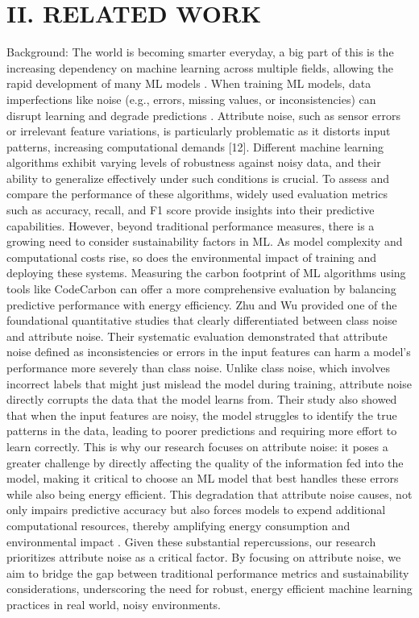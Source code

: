 \documentclass[conference]{IEEEtran}
\begin{document}
\section*{II. RELATED WORK}
Background: The world is becoming smarter everyday, a big part of this is the increasing dependency on machine learning across multiple fields, allowing the rapid development of many ML models \cite{bain_ai_sustainability}. When training ML models, data imperfections like noise (e.g., errors, missing values, or inconsistencies) can disrupt learning and degrade predictions \cite{sciencedirect_noise}. Attribute noise, such as sensor errors or irrelevant feature variations, is particularly problematic as it distorts input patterns, increasing computational demands [12]. Different machine learning algorithms exhibit varying levels of robustness against noisy data, and their ability to generalize effectively under such conditions is crucial. To assess and compare the performance of these algorithms, widely used evaluation metrics such as accuracy, recall, and F1 score provide insights into their predictive capabilities. However, beyond traditional performance measures, there is a growing need to consider sustainability factors in ML. As model complexity and computational costs rise, so does the environmental impact of training and deploying these systems. Measuring the carbon footprint of ML algorithms using tools like CodeCarbon can offer a more comprehensive evaluation by balancing predictive performance with energy efficiency.
\newline
\newline
Zhu and Wu \cite{wuzu} provided one of the foundational quantitative studies that clearly differentiated between class noise and attribute noise. Their systematic evaluation demonstrated that attribute noise defined as inconsistencies or errors in the input features can harm a model's performance more severely than class noise. Unlike class noise, which involves incorrect labels that might just mislead the model during training, attribute noise directly corrupts the data that the model learns from. Their study also showed that when the input features are noisy, the model struggles to identify the true patterns in the data, leading to poorer predictions and requiring more effort to learn correctly. This is why our research focuses on attribute noise: it poses a greater challenge by directly affecting the quality of the information fed into the model, making it critical to choose an ML model that best handles these errors while also being energy efficient.
\newline
\newline
This degradation that attribute noise causes, not only impairs predictive accuracy but also forces models to expend additional computational resources, thereby amplifying energy consumption and environmental impact \cite{wuzu}. Given these substantial repercussions, our research prioritizes attribute noise as a critical factor. By focusing on attribute noise, we aim to bridge the gap between traditional performance metrics and sustainability considerations, underscoring the need for robust, energy efficient machine learning practices in real world, noisy environments.
\end{document}
